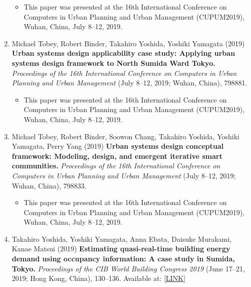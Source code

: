 \documentclass[
]{book}
\providecommand{\tightlist}{%
  \setlength{\itemsep}{0pt}\setlength{\parskip}{0pt}}
\begin{document}
\begin{enumerate}
  \begin{itemize}
  \tightlist
  \item
    This paper was presented at the 16th International Conference on Computers in Urban Planning and Urban Management (CUPUM2019), Wuhan, China, July 8--12, 2019.
  \end{itemize}
\item
  Michael Tobey, Robert Binder, Takahiro Yoshida, Yoshiki Yamagata (2019)
  \textbf{Urban systems design applicability case study: Applying urban systems design framework to North Sumida Ward Tokyo.}
  \emph{Proceedings of the 16th International Conference on Computers in Urban Planning and Urban Management} (July 8--12, 2019; Wuhan, China), 798881.

  \begin{itemize}
  \tightlist
  \item
    This paper was presented at the 16th International Conference on Computers in Urban Planning and Urban Management (CUPUM2019), Wuhan, China, July 8--12, 2019.
  \end{itemize}
\item
  Michael Tobey, Robert Binder, Soowon Chang, Takahiro Yoshida, Yoshiki Yamagata, Perry Yang (2019)
  \textbf{Urban systems design conceptual framework: Modeling, design, and emergent iterative smart communities.}
  \emph{Proceedings of the 16th International Conference on Computers in Urban Planning and Urban Management} (July 8--12, 2019; Wuhan, China), 798833.

  \begin{itemize}
  \tightlist
  \item
    This paper was presented at the 16th International Conference on Computers in Urban Planning and Urban Management (CUPUM2019), Wuhan, China, July 8--12, 2019.
  \end{itemize}
\item
  Takahiro Yoshida, Yoshiki Yamagata, Anna Ebata, Daisuke Murakami, Kanae Matsui (2019)
  \textbf{Estimating quasi-real-time building energy demand using occupancy information: A case study in Sumida, Tokyo.}
  \emph{Proceedings of the CIB World Building Congress 2019} (June 17--21, 2019; Hong Kong, China), 130--136.
  Available at: {[}\href{https://site.cibworld.nl/dl/publications/WBC19/WBC_Proceedings_June2019_Complete.pdf}{LINK}{]}


\end{enumerate}
\end{document}
